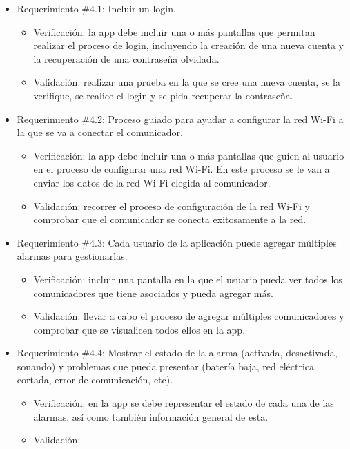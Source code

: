 \documentclass[
11pt, %
]{charter}
\begin{document}
\begin{itemize}
	\item Requerimiento \#4.1: Incluir un login.
	\begin{itemize}
		\item Verificación: la app debe incluir una o más pantallas que permitan realizar el proceso de login, incluyendo la creación de una nueva cuenta y la recuperación de una contraseña olvidada.
		\item Validación: realizar una prueba en la que se cree una nueva cuenta, se la verifique, se realice el login y se pida recuperar la contraseña.
	\end{itemize}
			
	\item Requerimiento \#4.2: Proceso guiado para ayudar a configurar la red Wi-Fi a la que se va a conectar el comunicador.
	\begin{itemize}
		\item Verificación: la app debe incluir una o más pantallas que guíen al usuario en el proceso de configurar una red Wi-Fi. En este proceso se le van a enviar los datos de la red Wi-Fi elegida al comunicador.
		\item Validación: recorrer el proceso de configuración de la red Wi-Fi y comprobar que el comunicador se conecta exitosamente a la red.
	\end{itemize}
			
	\item Requerimiento \#4.3: Cada usuario de la aplicación puede agregar múltiples alarmas para gestionarlas.
	\begin{itemize}
		\item Verificación: incluir una pantalla en la que el usuario pueda ver todos los comunicadores que tiene asociados y pueda agregar más.
		\item Validación: llevar a cabo el proceso de agregar múltiples comunicadores y comprobar que se visualicen todos ellos en la app.
	\end{itemize}
			
	\item Requerimiento \#4.4: Mostrar el estado de la alarma (activada, desactivada, sonando) y problemas que pueda presentar (batería baja, red eléctrica cortada, error de comunicación, etc).
	\begin{itemize}
		\item Verificación: en la app se debe representar el estado de cada una de las alarmas, así como también información general de esta.
		\item Validación:
	\end{itemize}
			

\end{itemize}
\end{document}
